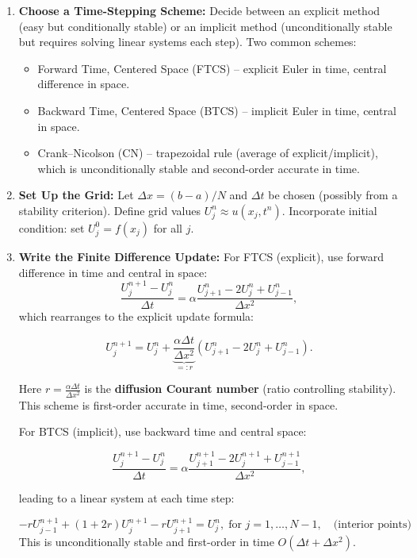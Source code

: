 \documentclass[a4paper,11pt]{report}
\begin{document}
\begin{enumerate}
    \item \textbf{Choose a Time-Stepping Scheme:} Decide between an explicit method (easy but conditionally stable) or an implicit method (unconditionally stable but requires solving linear systems each step). Two common schemes:
          \begin{itemize}
              \item Forward Time, Centered Space (FTCS) -- explicit Euler in time, central difference in space.
              \item Backward Time, Centered Space (BTCS) -- implicit Euler in time, central in space.
              \item Crank--Nicolson (CN) -- trapezoidal rule (average of explicit/implicit), which is unconditionally stable and second-order accurate in time.
          \end{itemize}
    \item \textbf{Set Up the Grid:} Let $\Delta x = (b-a)/N$ and $\Delta t$ be chosen (possibly from a stability criterion). Define grid values $U_j^n \approx u(x_j, t^n)$. Incorporate initial condition: set $U_j^0 = f(x_j)$ for all $j$.
    \item \textbf{Write the Finite Difference Update:} For FTCS (explicit), use forward difference in time and central in space:
          $$
              \frac{U_j^{n+1}-U_j^n}{\Delta t} = \alpha\frac{U_{j+1}^n - 2U_j^n + U_{j-1}^n}{\Delta x^2},
          $$
          which rearranges to the explicit update formula:

          $$
              U_j^{n+1} = U_j^n + \underbrace{\frac{\alpha\Delta t}{\Delta x^2}}_{=:r}\left(U_{j+1}^n - 2U_j^n + U_{j-1}^n\right).
          $$

          Here $r = \frac{\alpha\Delta t}{\Delta x^2}$ is the \textbf{diffusion Courant number} (ratio controlling stability)\cite{ddcampayo}.
          This scheme is first-order accurate in time, second-order in space.

          \medskip

          For BTCS (implicit), use backward time and central space:

          $$
              \frac{U_j^{n+1}-U_j^n}{\Delta t} = \alpha\frac{U_{j+1}^{n+1} - 2U_j^{n+1} + U_{j-1}^{n+1}}{\Delta x^2},
          $$

          leading to a linear system at each time step:

          $$
              -rU_{j-1}^{n+1} + (1+2r) U_j^{n+1} - rU_{j+1}^{n+1} = U_j^n, \; \text{for } j=1,\dots,N-1, \quad \text{(interior points)}
          $$
          This is unconditionally stable and first-order in time $O(\Delta t + \Delta x^2)$.


\end{enumerate}
\end{document}
